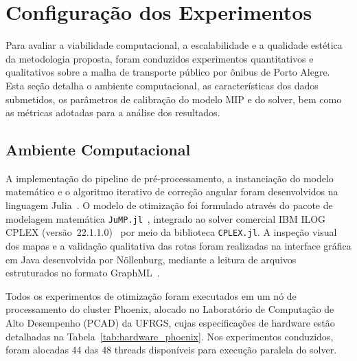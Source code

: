 \documentclass[cic,tc]{infufrgs}
\begin{document}
\section{Configuração dos Experimentos}
\label{sec:configuracao_experimentos}

Para avaliar a viabilidade computacional, a escalabilidade e a qualidade estética da metodologia proposta, foram conduzidos experimentos quantitativos e qualitativos sobre a malha de transporte público por ônibus de Porto Alegre. Esta seção detalha o ambiente computacional, as características dos dados submetidos, os parâmetros de calibração do modelo MIP e do solver, bem como as métricas adotadas para a análise dos resultados.
\subsection{Ambiente Computacional}
\label{subsec:ambiente_computacional}

A implementação do pipeline de pré-processamento, a instanciação do modelo matemático e o algoritmo iterativo de correção angular foram desenvolvidos na linguagem Julia~\cite{bezanson2017julia}. O modelo de otimização foi formulado através do pacote de modelagem matemática \texttt{JuMP.jl}~\cite{lubin2023jump}, integrado ao solver comercial IBM ILOG CPLEX (versão~22.1.1.0)~\cite{cplex2022} por meio da biblioteca \texttt{CPLEX.jl}. A inspeção visual dos mapas e a validação qualitativa das rotas foram realizadas na interface gráfica em Java desenvolvida por Nöllenburg, mediante a leitura de arquivos estruturados no formato GraphML~\cite{brandes2010graph}.

Todos os experimentos de otimização foram executados em um nó de processamento do cluster Phoenix, alocado no Laboratório de Computação de Alto Desempenho (PCAD) da UFRGS, cujas especificações de hardware estão detalhadas na Tabela~\ref{tab:hardware_phoenix}. Nos experimentos conduzidos, foram alocadas 44 das 48 threads disponíveis para execução paralela do solver.

\begin{table}[H]
    \centering
    \caption{Especificações de hardware do nó computacional utilizado no PCAD.}
    \label{tab:hardware_phoenix}
\end{table}
\end{document}

